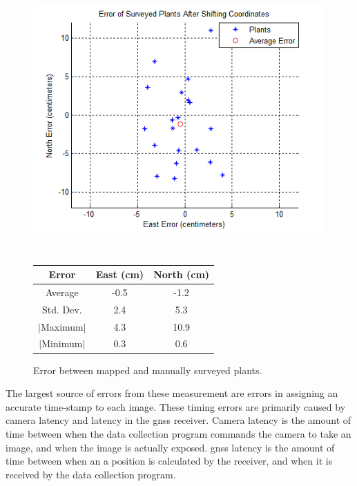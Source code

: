   \begin{figure}
	\centering
    \includegraphics[height=4in]{figures/plant_errors.png}
    \label{figure:plant_errors}
    \newline
    \newline
    \centering
    \begin{tabular}[c]{|c|c|c|}
        \hline
        Error & East (cm) & North (cm) \\ 
        \hline
        Average   & -0.5 & -1.2           \\
        Std. Dev. & 2.4 & 5.3       \\
        $|$Maximum$|$   & 4.3 & 10.9       \\
        $|$Minimum$|$   & 0.3 & 0.6       \\
        \hline
    \end{tabular}
    \captionsetup{labelformat=andtable}
    \caption{Error between mapped and manually surveyed plants.}
  \end{figure}

The largest source of errors from these measurement are errors in assigning an accurate time-stamp to each image.  These timing errors are primarily caused by camera latency and latency in the \ac{gnss} receiver.  Camera latency is the amount of time between when the data collection program commands the camera to take an image, and when the image is actually exposed.  \ac{gnss} latency is the amount of time between when an a position is calculated by the receiver, and when it is received by the data collection program. 

